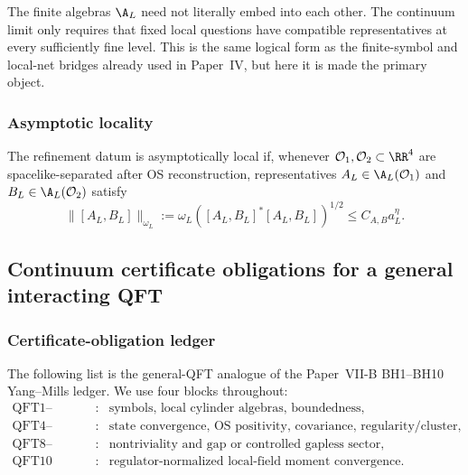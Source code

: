 \documentclass[12pt,a4paper]{article}
\begin{document}
\begin{remark}
The finite algebras \(\A_L\) need not literally embed into each other.  The continuum limit only requires that fixed local questions have compatible representatives at every sufficiently fine level.  This is the same logical form as the finite-symbol and local-net bridges already used in Paper~IV, but here it is made the primary object.
\end{remark}


\subsubsection{Asymptotic locality}
\label{p12:sec:asymptotic-locality}

\begin{definition}
\label{p12:def:asymptotic-local-commutativity}
The refinement datum is asymptotically local if, whenever \(\mathcal O_1,\mathcal O_2\subset\RR^4\) are spacelike-separated after OS reconstruction, representatives \(A_L\in\A_L(\mathcal O_1)\) and \(B_L\in\A_L(\mathcal O_2)\) satisfy
\begin{equation}
\label{p12:eq:asymptotic-commutator}
\|[A_L,B_L]\|_{\omega_L}
:=
\omega_L([A_L,B_L]^*[A_L,B_L])^{1/2}
\le C_{A,B}a_L^\eta .
\end{equation}
\end{definition}


\subsection{Continuum certificate obligations for a general interacting QFT}
\label{p12:sec:qft-obligations}


\subsubsection{Certificate-obligation ledger}
\label{p12:sec:qft-obligation-list}

The following list is the general-QFT analogue of the Paper~VII-B BH1--BH10 Yang--Mills ledger.  We use four blocks throughout:
\[
\begin{array}{ccl}
\text{QFT1--QFT3} &:& \text{symbols, local cylinder algebras, boundedness},\\
\text{QFT4--QFT7} &:& \text{state convergence, OS positivity, covariance, regularity/cluster},\\
\text{QFT8--QFT9} &:& \text{nontriviality and gap or controlled gapless sector},\\
\text{QFT10} &:& \text{regulator-normalized local-field moment convergence}.
\end{array}
\]
\end{document}
